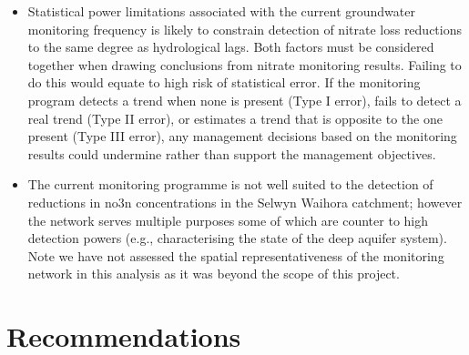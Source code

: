 \begin{itemize}
    \item Statistical power limitations associated with the current groundwater monitoring frequency is likely to constrain detection of nitrate loss reductions to the same degree as hydrological lags. Both factors must be considered together when drawing conclusions from nitrate monitoring results. Failing to do this would equate to high risk of statistical error. If the monitoring program detects a trend when none is present (Type I error), fails to detect a real trend (Type II error), or estimates a trend that is opposite to the one present (Type III error), any management decisions based on the monitoring results could undermine rather than support the management objectives.
    \item The current monitoring programme is not well suited to the detection of reductions in \gls{no3n} concentrations in the Selwyn Waihora catchment; however the network serves multiple purposes some of which are counter to high detection powers (e.g., characterising the state of the deep aquifer system). Note we have not assessed the spatial representativeness of the monitoring network in this analysis as it was beyond the scope of this project.
\end{itemize}

\pagebreak
\section[Recommendations]{Recommendations} \label{sec:recommendations}


